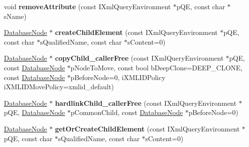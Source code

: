\begin{DoxyCompactItemize}
\item 
\hypertarget{classgeneral__server_1_1DatabaseNode_a9040a7dc7f646fa5c77283c62ca4adce}{void {\bfseries remove\-Attribute} (const \-I\-Xml\-Query\-Environment $\ast$p\-Q\-E, const char $\ast$s\-Name)}\label{classgeneral__server_1_1DatabaseNode_a9040a7dc7f646fa5c77283c62ca4adce}

\item 
\hypertarget{classgeneral__server_1_1DatabaseNode_ac46287d5f990b456e8d755df874c5c6c}{\hyperlink{classgeneral__server_1_1DatabaseNode}{\-Database\-Node} $\ast$ {\bfseries create\-Child\-Element} (const \-I\-Xml\-Query\-Environment $\ast$p\-Q\-E, const char $\ast$s\-Qualified\-Name, const char $\ast$s\-Content=0)}\label{classgeneral__server_1_1DatabaseNode_ac46287d5f990b456e8d755df874c5c6c}

\item 
\hypertarget{classgeneral__server_1_1DatabaseNode_ae6259b91ff18103e27d2dc0e80127c83}{\hyperlink{classgeneral__server_1_1DatabaseNode}{\-Database\-Node} $\ast$ {\bfseries copy\-Child\-\_\-caller\-Free} (const \-I\-Xml\-Query\-Environment $\ast$p\-Q\-E, const \hyperlink{classgeneral__server_1_1DatabaseNode}{\-Database\-Node} $\ast$p\-Node\-To\-Move, const bool b\-Deep\-Clone=\-D\-E\-E\-P\-\_\-\-C\-L\-O\-N\-E, const \hyperlink{classgeneral__server_1_1DatabaseNode}{\-Database\-Node} $\ast$p\-Before\-Node=0, i\-X\-M\-L\-I\-D\-Policy i\-X\-M\-L\-I\-D\-Move\-Policy=xmlid\-\_\-default)}\label{classgeneral__server_1_1DatabaseNode_ae6259b91ff18103e27d2dc0e80127c83}

\item 
\hypertarget{classgeneral__server_1_1DatabaseNode_a53d896d2ddd0825da491225e079cf9e0}{\hyperlink{classgeneral__server_1_1DatabaseNode}{\-Database\-Node} $\ast$ {\bfseries hardlink\-Child\-\_\-caller\-Free} (const \-I\-Xml\-Query\-Environment $\ast$p\-Q\-E, \hyperlink{classgeneral__server_1_1DatabaseNode}{\-Database\-Node} $\ast$p\-Common\-Child, const \hyperlink{classgeneral__server_1_1DatabaseNode}{\-Database\-Node} $\ast$p\-Before\-Node=0)}\label{classgeneral__server_1_1DatabaseNode_a53d896d2ddd0825da491225e079cf9e0}

\item 
\hypertarget{classgeneral__server_1_1DatabaseNode_a59d53293b127e56e67390027f5c3daa1}{\hyperlink{classgeneral__server_1_1DatabaseNode}{\-Database\-Node} $\ast$ {\bfseries get\-Or\-Create\-Child\-Element} (const \-I\-Xml\-Query\-Environment $\ast$p\-Q\-E, const char $\ast$s\-Qualified\-Name, const char $\ast$s\-Content=0)}\label{classgeneral__server_1_1DatabaseNode_a59d53293b127e56e67390027f5c3daa1}


\end{DoxyCompactItemize}
